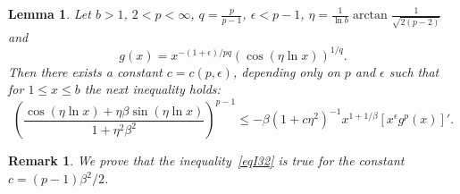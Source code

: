 \documentclass[10pt,a4paper]{amsart}
\newtheorem{lemma}[theorem]{Lemma}
\newtheorem{remark}[theorem]{Remark}
\numberwithin{equation}{section}
\begin{document}
\begin{lemma} \label{lem3}
	Let $b>1$, $2< p<\infty$, $q=\frac{p}{p-1}$,  $\epsilon< p-1$, %
	$\eta=\frac{1}{\ln b}\arctan{\frac{1}{\sqrt{2(p-2)}}}$ and
\begin{equation*}\label{eql31}
g(x)=x^{-(1+\epsilon)/pq}\left(\cos(\eta\ln x) \right)^{1/q}.
\end{equation*}
	Then 
	there exists a constant $c=c(p,\epsilon)$, depending only on $p$ and $\epsilon$ such that
	 for $1\le x\le b$  the next inequality holds:
\begin{equation}\label{eqI32}
\left(\frac{\cos(\eta\ln x)+\eta \beta\sin(\eta\ln x)}{1+\eta^2\beta^2} \right)^{p-1}\le
-\beta \left(1+c\eta^2 \right)^{-1}x^{1+1/\beta}\left[x^\epsilon g^p(x) \right]'.
\end{equation}
	\end{lemma}

\begin{remark}
We prove that the inequality~\eqref{eqI32} is true for the constant $c= (p-1)\beta^2/2$.
\end{remark}	
\end{document}
